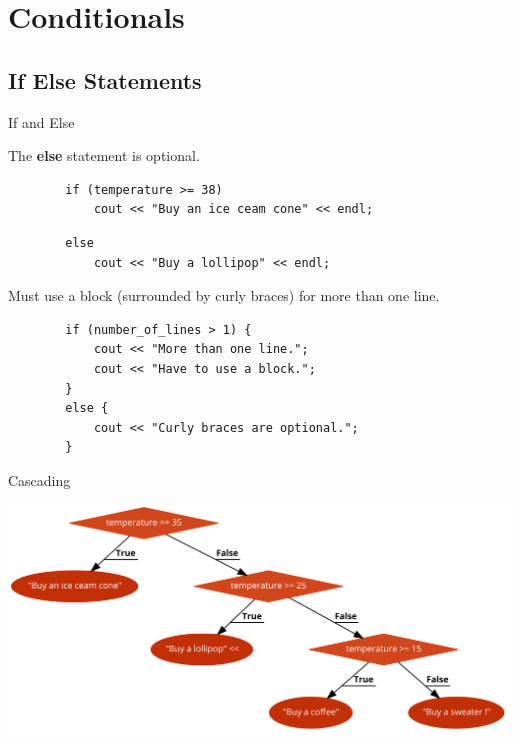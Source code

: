 \section{Conditionals}

\subsection{If Else Statements}
\begin{frame}[fragile]{If and Else}{}
    \begin{block}{}
        The \textbf{else} statement is optional.
    \end{block}
    \begin{verbatim}
        if (temperature >= 38)
            cout << "Buy an ice ceam cone" << endl;
    \end{verbatim}
    \pause
    \begin{verbatim}
        else
            cout << "Buy a lollipop" << endl;
    \end{verbatim}
    \pause
    \begin{block}{}
        Must use a block (surrounded by curly braces) for more than one line.
    \end{block}
    \begin{verbatim}
        if (number_of_lines > 1) {
            cout << "More than one line.";
            cout << "Have to use a block.";
        }
        else {
            cout << "Curly braces are optional.";
        }
    \end{verbatim}
\end{frame}

\begin{frame}[fragile]{Cascading}{}
    \begin{center}
        \includegraphics[width=\linewidth]{images/cascading.png}
    \end{center}
\end{frame}

